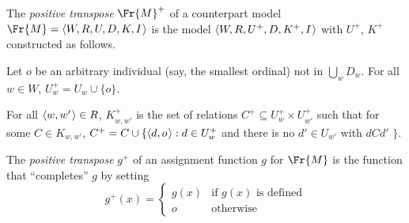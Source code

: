 \documentclass[11pt]{woarticle}
\newcommand{\cmnt}[1]{\iffalse #1 \fi}
\theoremstyle{break}
\theoremstyle{nonumberplain}
\newcommand{\1}{\;\,|\;\,}
\renewcommand{\t}[1]{\ensuremath{\langle #1  \makebox[.2ex]{}\rangle}}
\begin{document}
\begin{definition}{\label{!TRANSPOSE}}
  The \emph{positive transpose} $\Fr{M}^+$ of a counterpart model
  $\Fr{M} = \t{W,R,U,D,K,I}$ is the model $\t{W,R,U^+,D,K^+,I}$ with $U^+$,
  $K^+$ constructed as follows.

  Let $o$ be an arbitrary individual (say, the smallest ordinal) not in
  $\bigcup_w D_w$. For all $w\in W$, $U^+_w = U_w \cup \{ o \}$.

  For all $\t{w,w'}\in R$, $K^+_{w,w'}$ is the set of relations
  $C^+ \subseteq U^+_w\times U^+_{w'}$ such that for some $C \in K_{w,w'}$,
  $C^+ = C \cup \{ \t{d,o} : d\in U^+_{w}$ and there is no $d'\in U_{w'}$ with
  $dCd'$ $\}$.%
  \cmnt{%
    (So in particular, $C^+$ contains $\t{o,o}$.)%
  } %

  The \emph{positive transpose} $g^{+}$ of an assignment function $g$ for
  $\Fr{M}$ is the function that ``completes'' $g$ by setting
  \[
    g^{+}(x) = \begin{cases}
                 g(x) &\text{if $g(x)$ is defined}\\
                 o &\text{otherwise}
               \end{cases}
  \]
\end{definition}
\end{document}
